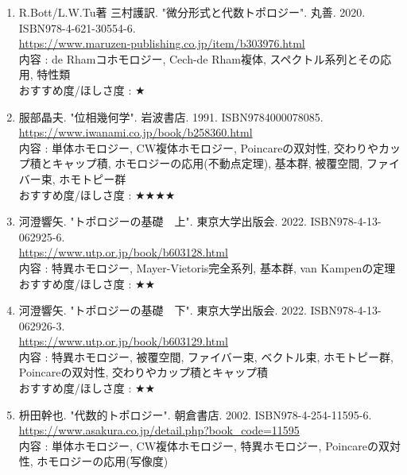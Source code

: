 \documentclass[10pt,a4paper]{jsarticle}
\begin{document}
    \begin{enumerate}
        \renewcommand{\theenumi}{[TG\arabic{enumi}]}
        \renewcommand{\labelenumi}{\theenumi}
        \setcounter{enumi}{3}
        \item \label{BTTG} R.Bott/L.W.Tu著 三村護訳. "微分形式と代数トポロジー". 丸善. 2020. ISBN978-4-621-30554-6. \\
        \url{https://www.maruzen-publishing.co.jp/item/b303976.html} \\
        内容 : de Rhamコホモロジー, Cech-de Rham複体, スペクトル系列とその応用, 特性類\\
        おすすめ度/ほしさ度 : $\bigstar $
        \item \label{HATG} 服部晶夫. "位相幾何学". 岩波書店. 1991. ISBN9784000078085. \\
        \url{https://www.iwanami.co.jp/book/b258360.html} \\
        内容 : 単体ホモロジー, CW複体ホモロジー, Poincareの双対性, 交わりやカップ積とキャップ積, ホモロジーの応用(不動点定理), 基本群, 被覆空間, ファイバー束, ホモトピー群\\
        おすすめ度/ほしさ度 : $\bigstar \bigstar \bigstar \bigstar $
        \item \label{KKTG1} 河澄響矢. "トポロジーの基礎　上". 東京大学出版会. 2022. ISBN978-4-13-062925-6. \\
        \url{https://www.utp.or.jp/book/b603128.html} \\
        内容 : 特異ホモロジー, Mayer-Vietoris完全系列, 基本群, van Kampenの定理\\
        おすすめ度/ほしさ度 : $\bigstar \bigstar $
        \item \label{KKTG2} 河澄響矢. "トポロジーの基礎　下". 東京大学出版会. 2022. ISBN978-4-13-062926-3. \\
        \url{https://www.utp.or.jp/book/b603129.html} \\
        内容 : 特異ホモロジー, 被覆空間, ファイバー束, ベクトル束, ホモトピー群, Poincareの双対性, 交わりやカップ積とキャップ積\\
        おすすめ度/ほしさ度 : $\bigstar \bigstar $
        \item \label{MMTG} 枡田幹也. "代数的トポロジー". 朝倉書店. 2002. ISBN978-4-254-11595-6. \\
        \url{https://www.asakura.co.jp/detail.php?book_code=11595} \\
        内容 : 単体ホモロジー, CW複体ホモロジー, 特異ホモロジー, Poincareの双対性, ホモロジーの応用(写像度)\\

\end{enumerate}
\end{document}
